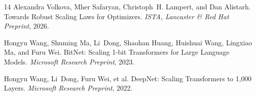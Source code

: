 \documentclass[11pt,a4paper]{article}
\begin{document}
\begin{thebibliography}{14}
Alexandra Volkova, Mher Safaryan, Christoph~H. Lampert, and Dan Alistarh.
\newblock Towards Robust Scaling Laws for Optimizers.
\newblock \emph{ISTA, Lancaster \& Red Hat Preprint}, 2026.

Hongyu Wang, Shuming Ma, Li~Dong, Shaohan Huang, Huishuai Wang, Lingxiao Ma, and Furu Wei.
\newblock BitNet: Scaling 1-bit Transformers for Large Language Models.
\newblock \emph{Microsoft Research Preprint}, 2023.

Hongyu Wang, Li~Dong, Furu Wei, et al.
\newblock DeepNet: Scaling Transformers to 1,000 Layers.
\newblock \emph{Microsoft Research Preprint}, 2022.

\end{thebibliography}
\end{document}

